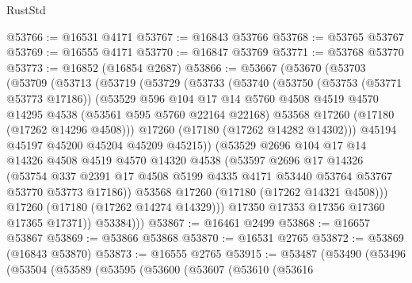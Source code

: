 \begin{lexlean}{RustStd}
\begin{coremodule}
@53766 := @16531 @4171
@53767 := @16843 @53766
@53768 := @53765 @53767
@53769 := @16555 @4171
@53770 := @16847 @53769
@53771 := @53768 @53770
@53773 := @16852 (@16854 @2687)
@53866 := @53667
    (@53670
      (@53703
        (@53709
          (@53713
            (@53719
              (@53729
                (@53733
                  (@53740
                    (@53750
                      (@53753 (@53771 @53773 @17186))
                      (@53529
                        @596
                        @104
                        @17
                        @14
                        @5760
                        @4508
                        @4519
                        @4570
                        @14295
                        @4538
                        (@53561 @595 @5760 @22164 @22168)
                        @53568
                        @17260
                        (@17180 (@17262 @14296 @4508)))
                      @17260
                      (@17180 (@17262 @14282 @14302)))
                    @45194
                    @45197
                    @45200
                    @45204
                    @45209
                    @45215))
                (@53529
                  @2696
                  @104
                  @17
                  @14
                  @14326
                  @4508
                  @4519
                  @4570
                  @14320
                  @4538
                  (@53597
                    @2696
                    @17
                    @14326
                    (@53754
                      @337
                      @2391
                      @17
                      @4508
                      @5199
                      @4335
                      @4171
                      @53440
                      @53764
                      @53767
                      @53770
                      @53773
                      @17186))
                  @53568
                  @17260
                  (@17180 (@17262 @14321 @4508)))
                @17260
                (@17180 (@17262 @14274 @14329)))
              @17350
              @17353
              @17356
              @17360
              @17365
              @17371))
          @53384)))
@53867 := @16461 @2499
@53868 := @16657 @53867
@53869 := @53866 @53868
@53870 := @16531 @2765
@53872 := @53869 (@16843 @53870)
@53873 := @16555 @2765
@53915 := @53487
    (@53490
      (@53496
        (@53504
          (@53589
            (@53595
              (@53600
                (@53607
                  (@53610
                    (@53616

\end{coremodule}
\end{lexlean}
